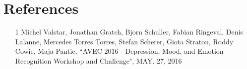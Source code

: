 \documentclass{article}
\begin{document}
	\section{References}
	\begin{itemize}
		\item
		[1] Michel Valstar, Jonathan Gratch, Bjorn Schuller, Fabian Ringeval, Denis Lalanne, Mercedes Torres Torres, Stefan Scherer, Giota Stratou, Roddy Cowie, Maja Pantic, ``AVEC 2016 - Depression, Mood, and Emotion Recognition Workshop and Challenge", MAY. 27, 2016 \\
	\end{itemize}
\end{document}
